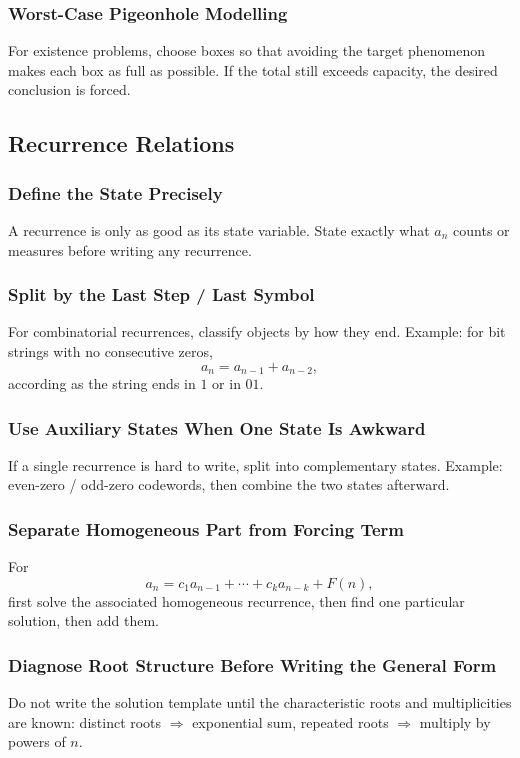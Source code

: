 \documentclass[12pt]{article}
\begin{document}
\subsubsection{Worst-Case Pigeonhole Modelling}
For existence problems, choose boxes so that avoiding the target phenomenon makes each box as full as possible. If the total still exceeds capacity, the desired conclusion is forced.

\subsection{Recurrence Relations}

\subsubsection{Define the State Precisely}
A recurrence is only as good as its state variable.
State exactly what \(a_n\) counts or measures before writing any recurrence.

\subsubsection{Split by the Last Step / Last Symbol}
For combinatorial recurrences, classify objects by how they end.
Example: for bit strings with no consecutive zeros,
\[
a_n=a_{n-1}+a_{n-2},
\]
according as the string ends in \(1\) or in \(01\).

\subsubsection{Use Auxiliary States When One State Is Awkward}
If a single recurrence is hard to write, split into complementary states.
Example: even-zero / odd-zero codewords, then combine the two states afterward.

\subsubsection{Separate Homogeneous Part from Forcing Term}
For
\[
a_n=c_1a_{n-1}+\cdots+c_ka_{n-k}+F(n),
\]
first solve the associated homogeneous recurrence, then find one particular solution, then add them.

\subsubsection{Diagnose Root Structure Before Writing the General Form}
Do not write the solution template until the characteristic roots and multiplicities are known:
distinct roots \(\Rightarrow\) exponential sum,
repeated roots \(\Rightarrow\) multiply by powers of \(n\).
\end{document}
